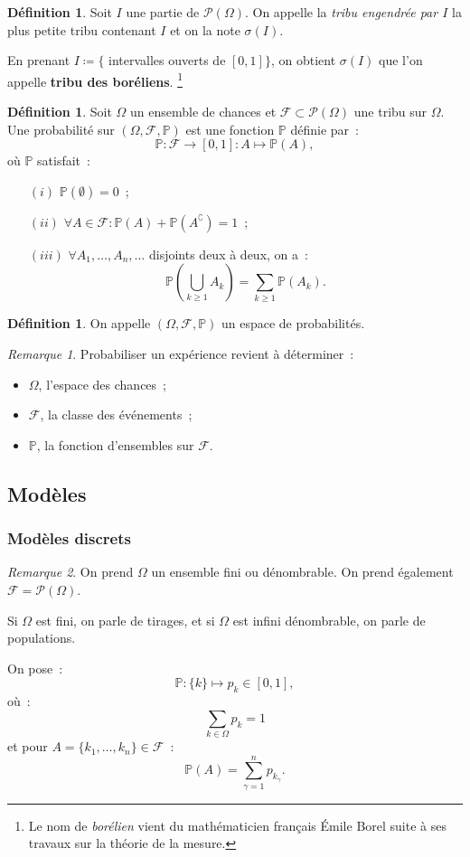 \documentclass{article}
\renewcommand{\P}{\mathbb P}
\newcommand{\espproba}[3]{\left(#1, #2, #3\right)}  %
\newcommand{\Ofp}{\espproba \Omega{\mathcal F}\P}  %
\theoremstyle{definition}
\newtheorem{déf}[thm]{Définition}
\theoremstyle{remark}
\newtheorem*{rmq}{Remarque}
\begin{document}
		\begin{déf}\label{boréliens} Soit $I$ une partie de $\mathcal P(\Omega)$. On appelle la \emph{tribu engendrée par $I$} la plus petite tribu contenant
		$I$ et on la note $\sigma(I)$.
		
		En prenant $I \coloneqq \{$ intervalles ouverts de $[0, 1]\}$, on obtient $\sigma(I)$ que l'on appelle \textbf{tribu des boréliens}.
		\footnote{Le nom de \emph{borélien} vient du mathématicien français Émile Borel suite à ses travaux sur la théorie de la mesure.} \end{déf}

		\begin{déf} Soit $\Omega$ un ensemble de chances et $\mathcal F \subset \mathcal P(\Omega)$ une tribu sur $\Omega$. Une probabilité sur
		$\Ofp$ est une fonction $\P$ définie par~:
		\[\P : \mathcal F \to [0, 1] : A \mapsto \P(A),\]
		où $\P$ satisfait~:

		\begin{itemize}
			\item[$(i)$] $\P(\emptyset) = 0$~;
			\item[$(ii)$] $\forall A \in \mathcal F : \P(A) + \P(A^\complement) = 1$~;
			\item[$(iii)$] $\forall A_1, \dotsc, A_n, \ldots$ disjoints deux à deux, on a~:
			               \[\P\left(\bigcup_{k \geq 1}A_k\right) = \sum_{k \geq 1}\P(A_k).\]
		\end{itemize}
		\end{déf}

		\begin{déf} On appelle $\Ofp$ un espace de probabilités. \end{déf}

		\begin{rmq} Probabiliser un expérience revient à déterminer~:
		\begin{itemize}
			\item $\Omega$, l'espace des chances~;
			\item $\mathcal F$, la classe des événements~;
			\item $\P$, la fonction d'ensembles sur $\mathcal F$.
		\end{itemize}
		\end{rmq}
	
	\subsection{Modèles}
		\subsubsection{Modèles discrets}
		\begin{rmq} On prend $\Omega$ un ensemble fini ou dénombrable. On prend également $\mathcal F = \mathcal P(\Omega)$.

		Si $\Omega$ est fini, on parle de tirages, et si $\Omega$ est infini dénombrable, on parle de populations.

		On pose~:
		\[\P : \{k\} \mapsto p_k \in [0, 1],\]
		où~:
		\[\sum_{k \in \Omega}p_k = 1\]
		et pour $A = \{k_1, \dotsc, k_n\} \in \mathcal F$~:
		\[\P(A) = \sum_{\gamma=1}^np_{k_\gamma}.\]
		\end{rmq}
\end{document}
